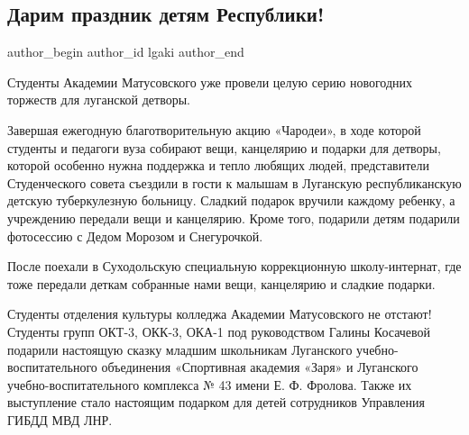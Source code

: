  
 
 
 
 
\subsection{Дарим праздник детям Республики!}
\label{sec:26_12_2021.stz.edu.lnr.lgaki.1.prazdnik_deti_respubliki}

\ifcmt
 author_begin
   author_id lgaki
 author_end
\fi

Студенты Академии Матусовского уже провели целую серию новогодних торжеств для
луганской детворы.


Завершая ежегодную благотворительную акцию «Чародеи», в ходе которой студенты и
педагоги вуза собирают вещи, канцелярию и подарки для детворы, которой особенно
нужна поддержка и тепло любящих людей, представители Студенческого совета
съездили в гости к малышам в Луганскую республиканскую детскую туберкулезную
больницу. Сладкий подарок вручили каждому ребенку, а учреждению передали вещи и
канцелярию. Кроме того, подарили детям подарили фотосессию с Дедом Морозом и
Снегурочкой.


После поехали в Суходольскую специальную коррекционную школу-интернат, где тоже
передали деткам собранные нами вещи, канцелярию и сладкие подарки.


Студенты отделения культуры колледжа Академии Матусовского не отстают! Студенты
групп ОКТ-3, ОКК-3, ОКА-1 под руководством Галины Косачевой подарили настоящую
сказку младшим школьникам Луганского учебно-воспитательного объединения
«Спортивная академия «Заря» и Луганского учебно-воспитательного комплекса № 43
имени Е. Ф. Фролова. Также их выступление стало настоящим подарком для детей
сотрудников Управления ГИБДД МВД ЛНР.

